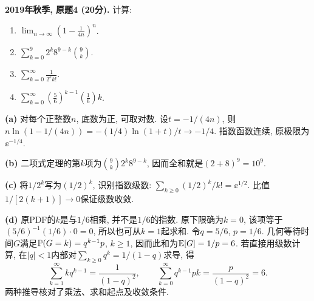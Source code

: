 \begin{exercise}\label{ex:m1-2019f-q4}
\textbf{2019年秋季, 原题4 (20分).} 计算:
\begin{enumerate}
\item[(a)]\label{ex:m1-2019f-q4-a} $\displaystyle\lim_{n\to\infty}\left(1-\frac1{4n}\right)^n$.
\item[(b)]\label{ex:m1-2019f-q4-b} $\displaystyle\sum_{k=0}^{9}2^k8^{9-k}\binom9k$.
\item[(c)]\label{ex:m1-2019f-q4-c} $\displaystyle\sum_{k=0}^{\infty}\frac1{2^k k!}$.
\item[(d)]\label{ex:m1-2019f-q4-d} $\displaystyle\sum_{k=0}^{\infty}\left(\frac56\right)^{k-1}\left(\frac16\right)k$.
\end{enumerate}
\end{exercise}
\begin{solution}
\textbf{(a)}\label{sol:m1-2019f-q4-a} 对每个正整数$n$, 底数为正, 可取对数. 设$t=-1/(4n)$, 则$n\ln(1-1/(4n))=-(1/4)\ln(1+t)/t\to-1/4$. 指数函数连续, 原极限为$\ee^{-1/4}$.

\textbf{(b)}\label{sol:m1-2019f-q4-b} 二项式定理的第$k$项为$\binom9k2^k8^{9-k}$, 因而全和就是$(2+8)^9=10^9$.

\textbf{(c)}\label{sol:m1-2019f-q4-c} 将$1/2^k$写为$(1/2)^k$, 识别指数级数: $\sum_{k\ge0}(1/2)^k/k!=\ee^{1/2}$. 比值$1/[2(k+1)]\to0$保证级数收敛.

\textbf{(d)}\label{sol:m1-2019f-q4-d} 原PDF的$k$是与$1/6$相乘, 并不是$1/6$的指数. 原下限确为$k=0$, 该项等于$(5/6)^{-1}(1/6)\cdot0=0$, 所以也可从$k=1$起求和. 令$q=5/6$, $p=1/6$. 几何等待时间$G$满足$\mathbb P(G=k)=q^{k-1}p$, $k\ge1$, 因而此和为$\mathbb E[G]=1/p=6$. 若直接用级数计算, 在$|q|<1$内部对$\sum_{k\ge0}q^k=1/(1-q)$求导, 得
\[
\sum_{k=1}^{\infty}kq^{k-1}=\frac1{(1-q)^2},\qquad
\sum_{k=0}^{\infty}q^{k-1}pk=\frac{p}{(1-q)^2}=6.
\]
两种推导核对了乘法、求和起点及收敛条件.
\end{solution}

